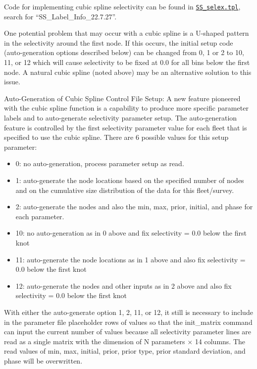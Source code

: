 Code for implementing cubic spline selectivity can be found in
\href{https://github.com/nmfs-ost/ss3-source-code/blob/main/SS_selex.tpl}{\texttt{SS\_selex.tpl}},
search for ``SS\_Label\_Info\_22.7.27''.

One potential problem that may occur with a cubic spline is a U-shaped pattern in the selectivity around the first node. If this occurs, the initial setup code (auto-generation options described below) can be changed from 0, 1 or 2 to 10, 11, or 12 which will cause selectivity to be fixed at 0.0 for all bins below the first node. A natural cubic spline (noted above) may be an alternative solution to this issue.

Auto-Generation of Cubic Spline Control File Setup: A new feature pioneered with the cubic spline function is a capability to produce more specific parameter labels and to auto-generate selectivity parameter setup. The auto-generation feature is controlled by the first selectivity parameter value for each fleet that is specified to use the cubic spline. There are 6 possible values for this setup parameter:
	\begin{itemize}
		\item 0: no auto-generation, process parameter setup as read.
		\item 1: auto-generate the node locations based on the specified number of nodes and on the cumulative size distribution of the data for this fleet/survey.
		\item 2: auto-generate the nodes and also the min, max, prior, initial, and phase for each parameter. 
		\item 10: no auto-generation as in 0 above and fix selectivity = 0.0 below the first knot
		\item 11: auto-generate the node locations as in 1 above and also fix selectivity = 0.0 below the first knot
		\item 12: auto-generate the nodes and other inputs as in 2 above and also fix selectivity = 0.0 below the first knot 
	\end{itemize}
	
With either the auto-generate option 1, 2, 11, or 12, it still is necessary to include in the parameter file placeholder rows of values so that the init\_matrix command can input the current number of values because all selectivity parameter lines are read as a single matrix with the dimension of N parameters $\times$ 14 columns. The read values of min, max, initial, prior, prior type, prior standard deviation, and phase will be overwritten.
	
